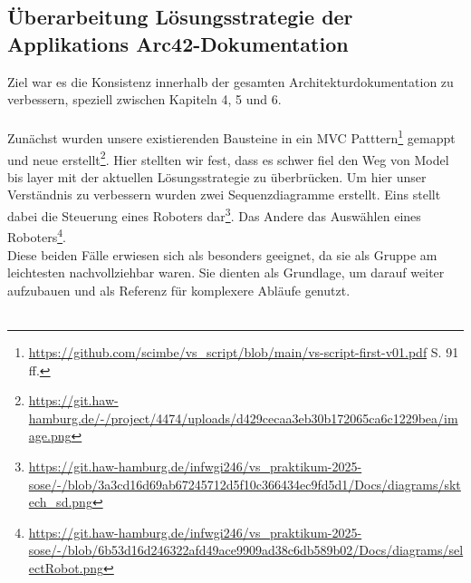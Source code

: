 \documentclass{article}
\begin{document}
\subsection{Überarbeitung Lösungsstrategie der Applikations Arc42-Dokumentation}
Ziel war es die Konsistenz innerhalb der gesamten Architekturdokumentation zu verbessern, speziell zwischen Kapiteln 4, 5 und 6. \\
\\
Zunächst wurden unsere existierenden Bausteine in ein MVC Patttern\footnote{\url{https://github.com/scimbe/vs_script/blob/main/vs-script-first-v01.pdf} S. 91 ff. }  gemappt und neue erstellt\footnote{\url{https://git.haw-hamburg.de/-/project/4474/uploads/d429cecaa3eb30b172065ca6c1229bea/image.png}}. 
Hier stellten wir fest, dass es schwer fiel den Weg von Model bis layer mit der aktuellen Lösungsstrategie zu überbrücken.
Um hier unser Verständnis zu verbessern wurden zwei Sequenzdiagramme erstellt. 
Eins stellt dabei die Steuerung eines Roboters dar\footnote{\url{https://git.haw-hamburg.de/infwgi246/vs_praktikum-2025-sose/-/blob/3a3cd16d69ab67245712d5f10c366434ec9fd5d1/Docs/diagrams/sktech_sd.png}}.
Das Andere das Auswählen eines Roboters\footnote{\url{https://git.haw-hamburg.de/infwgi246/vs_praktikum-2025-sose/-/blob/6b53d16d246322afd49ace9909ad38c6db589b02/Docs/diagrams/selectRobot.png}}.\\
Diese beiden Fälle erwiesen sich als besonders geeignet, da sie als Gruppe am leichtesten nachvollziehbar waren. Sie dienten als Grundlage, um darauf weiter aufzubauen und als Referenz für komplexere Abläufe genutzt.\\
\\
\end{document}
